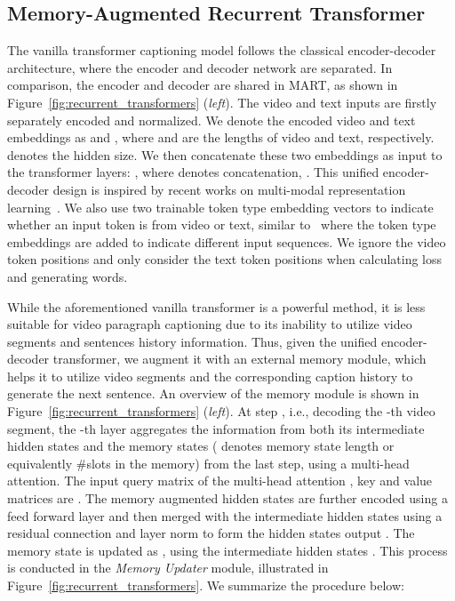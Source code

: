 \documentclass[11pt,a4paper]{article}
\begin{document}
\subsection{Memory-Augmented Recurrent Transformer}
The vanilla transformer captioning model follows the classical encoder-decoder architecture, where the encoder and decoder network are separated. 
In comparison, the encoder and decoder are shared in MART, as shown in Figure~\ref{fig:recurrent_transformers} (\textit{left}).
The video and text inputs are firstly separately encoded and normalized. We denote the encoded video and text embeddings as  and , where  and  are the lengths of video and text, respectively.  denotes the hidden size. 
We then concatenate these two embeddings as input to the transformer layers: , where  denotes concatenation, .
This unified encoder-decoder design is inspired by recent works on multi-modal representation learning~\cite{chen2019uniter, sun2019videobert}.
We also use two trainable token type embedding vectors to indicate whether an input token is from video or text, similar to~\citet{devlin2018bert} where the token type embeddings are added to indicate different input sequences. 
We ignore the video token positions and only consider the text token positions when calculating loss and generating words.


While the aforementioned vanilla transformer is a powerful method, it is less suitable for video paragraph captioning due to its inability to utilize video segments and sentences history information. 
Thus, given the unified encoder-decoder transformer, we augment it with an external memory module, which helps it to utilize video segments and the corresponding caption history to generate the next sentence.
An overview of the memory module is shown in Figure~\ref{fig:recurrent_transformers} (\textit{left}).
At step , i.e., decoding the -th video segment, the -th layer aggregates the information from both its intermediate hidden states  and the memory states  ( denotes memory state length or equivalently \#slots in the memory) from the last step, using a multi-head attention. 
The input query matrix of the multi-head attention , key and value matrices are . 
The memory augmented hidden states are further encoded using a feed forward layer and then merged with the intermediate hidden states  using a residual connection and layer norm to form the hidden states output .
The memory state  is updated as , using the intermediate hidden states . This process is conducted in the \textit{Memory Updater} module, illustrated in Figure~\ref{fig:recurrent_transformers}. We summarize the procedure below:
\vspace{3pt}
\end{document}

